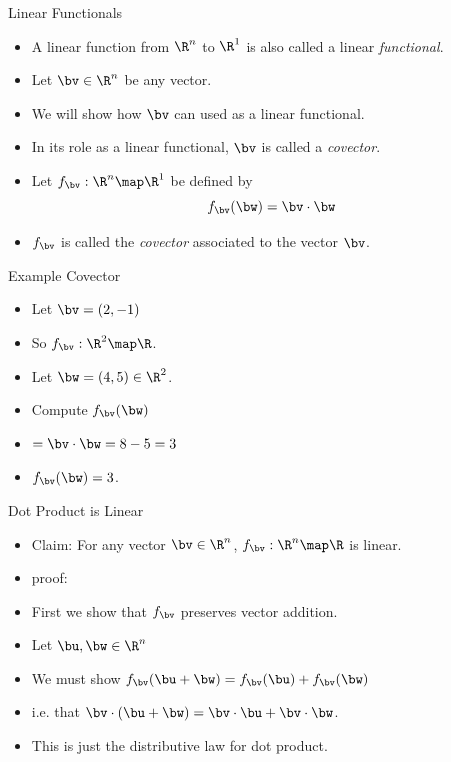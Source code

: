 \documentclass{beamer}
\begin{document}
\begin{frame}{Linear Functionals}

\begin{itemize}
\item A linear function from $\R^n$ to $\R^1$ is also called a linear
\emph{functional}.
\item Let $\bv \in \R^n$ be any vector.
\item We will show how $\bv$ can used as a linear functional.
\item In its role as a linear functional, $\bv$ is called a \emph{covector}.
\item Let $f_{\bv} : \R^n \map \R^1$ be defined by
$$f_{\bv}(\bw) = \bv \cdot \bw$$
\item $f_{\bv}$ is called the \emph{covector} associated to the vector $\bv$.
\end{itemize}

\end{frame}

\begin{frame}{Example Covector}

\begin{itemize}
\item Let $\bv = (2, -1)$
\item So $f_{\bv}:\R^2 \map \R$.
\item Let $\bw = (4, 5) \in \R^2$.
\item Compute $f_{\bv}(\bw)$
\item $= \bv \cdot \bw = 8 - 5 = 3$
\item $f_{\bv}(\bw) =  3$.
\end{itemize}

\end{frame}

\begin{frame}{Dot Product is Linear}

\begin{itemize}
\item Claim: For any vector $\bv\in\R^n$, $f_{\bv}:\R^n\map\R$ is linear.
\item proof:
\item First we show that $f_{\bv}$ preserves vector addition.
\item Let $\bu, \bw \in \R^n$
\item We must show $f_{\bv}(\bu + \bw) = f_{\bv}(\bu) + f_{\bv}(\bw)$
\item i.e. that $\bv \cdot (\bu + \bw) = \bv \cdot \bu + \bv \cdot \bw$.
\item This is just the distributive law for dot product.
\end{itemize}

\end{frame}
\end{document}
